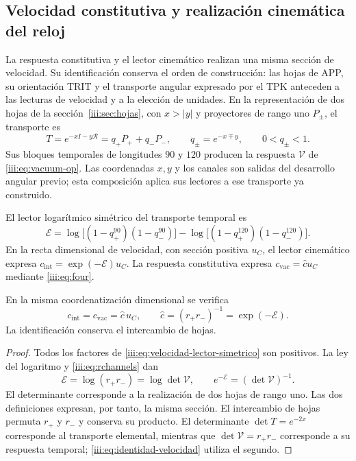 \subsection{Velocidad constitutiva y realización cinemática del reloj}
\label{iii:sec:enlace-velocidad-constitutiva}

La respuesta constitutiva y el lector cinemático realizan una misma
sección de velocidad. Su identificación conserva el orden de construcción:
las hojas de APP, su orientación TRIT y el transporte angular expresado
por el TPK anteceden a las lecturas de velocidad y a la elección de unidades.
En la representación de dos hojas de la
sección~\ref{iii:sec:hojas}, con $x>|y|$ y proyectores de rango uno
$P_\pm$, el transporte es
\[
 T=e^{-xI-y\mathcal R}=q_+P_++q_-P_-,
 \qquad q_\pm=e^{-x\mp y},\qquad 0<q_\pm<1.
\]
Sus bloques temporales de longitudes $90$ y $120$ producen la respuesta
$\mathcal V$ de \eqref{iii:eq:vacuum-op}. Las coordenadas $x,y$ y los
canales son salidas del desarrollo angular previo; esta composición
aplica sus lectores a ese transporte ya construido.

El lector logarítmico simétrico del transporte temporal es
\begin{equation}
 \mathcal E=
 \log\!\bigl[(1-q_+^{90})(1-q_-^{90})\bigr]
 -\log\!\bigl[(1-q_+^{120})(1-q_-^{120})\bigr].
 \label{iii:eq:velocidad-lector-simetrico}
\end{equation}
En la recta dimensional de velocidad, con sección positiva $u_C$, el
lector cinemático expresa $c_{\mathrm{int}}=\exp(-\mathcal E)u_C$.
La respuesta constitutiva expresa
$c_{\mathrm{vac}}=\widehat c u_C$ mediante \eqref{iii:eq:four}.

\begin{proposition}
\label{iii:prop:identidad-velocidad}
En la misma coordenatización dimensional se verifica
\begin{equation}
 c_{\mathrm{int}}=c_{\mathrm{vac}}=\widehat c\,u_C,
 \qquad \widehat c=(r_+r_-)^{-1}=\exp(-\mathcal E).
 \label{iii:eq:identidad-velocidad}
\end{equation}
La identificación conserva el intercambio de hojas.
\end{proposition}
\begin{proof}
Todos los factores de \eqref{iii:eq:velocidad-lector-simetrico} son
positivos. La ley del logaritmo y \eqref{iii:eq:rchannels} dan
\[
 \mathcal E=\log(r_+r_-)=\log\det\mathcal V,
 \qquad e^{-\mathcal E}=(\det\mathcal V)^{-1}.
\]
El determinante corresponde a la realización de dos hojas de rango uno.
Las dos definiciones expresan, por tanto, la misma sección. El intercambio
de hojas permuta $r_+$ y $r_-$ y conserva su producto. El determinante
$\det T=e^{-2x}$ corresponde al transporte elemental, mientras que
$\det\mathcal V=r_+r_-$ corresponde a su respuesta temporal;
\eqref{iii:eq:identidad-velocidad} utiliza el segundo.
\end{proof}

